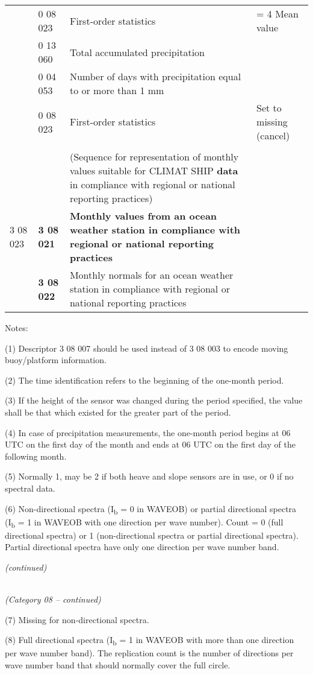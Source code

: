 \begin{longtable}[]{@{}llll@{}}
& 0 08 023 & First-order statistics & = 4 Mean value\tabularnewline
& 0 13 060 & Total accumulated precipitation &\tabularnewline
& 0 04 053 & Number of days with precipitation equal to or more than 1 mm &\tabularnewline
& 0 08 023 & First-order statistics & Set to missing (cancel)\tabularnewline
& & &\tabularnewline
& & (Sequence for representation of monthly values suitable for CLIMAT SHIP \textbf{data} in compliance with regional or national reporting practices) &\tabularnewline
3 08 023 & \textbf{3 08 021} & \textbf{Monthly values from an ocean weather station in compliance with regional or national reporting practices} &\tabularnewline
& \textbf{3 08 022} & Monthly normals for an ocean weather station in compliance with regional or national reporting practices &\tabularnewline
\bottomrule
\end{longtable}

Notes:

(1) Descriptor 3 08 007 should be used instead of 3 08 003 to encode moving buoy/platform information.

(2) The time identification refers to the beginning of the one-month period.

(3) If the height of the sensor was changed during the period specified, the value shall be that which existed for the greater part of the period.

(4) In case of precipitation measurements, the one-month period begins at 06 UTC on the first day of the month and ends at 06 UTC on the first day of the following month.

(5) Normally 1, may be 2 if both heave and slope sensors are in use, or 0 if no spectral data.

(6) Non-directional spectra (I\textsubscript{b} = 0 in WAVEOB) or partial directional spectra (I\textsubscript{b} = 1 in WAVEOB with one direction per wave number). Count = 0 (full directional spectra) or 1 (non-directional spectra or partial directional spectra). Partial directional spectra have only one direction per wave number band.

\emph{(continued)}

\emph{\\
(Category 08 -- continued)}

(7) Missing for non-directional spectra.

(8) Full directional spectra (I\textsubscript{b} = 1 in WAVEOB with more than one direction per wave number band). The replication count is the number of directions per wave number band that should normally cover the full circle.

